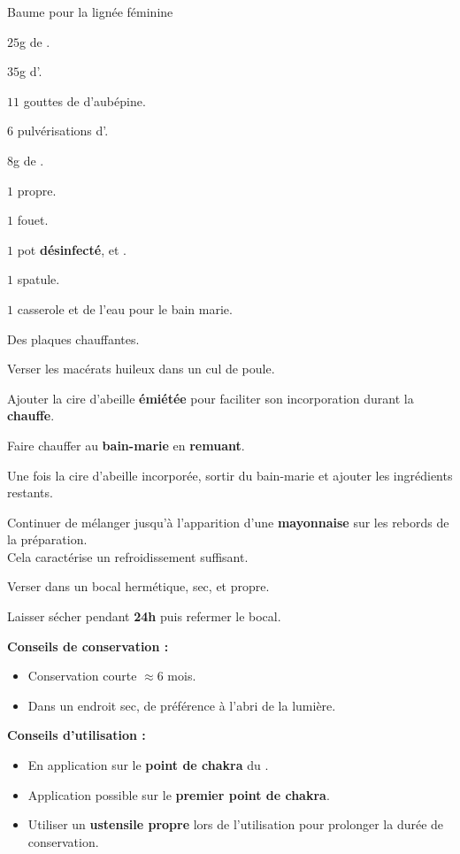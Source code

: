 
\ficherecette
{%
    Baume pour la lignée féminine
}
{%
    \item $25$g de .
    \item $35$g d'.
    \item $11$ gouttes de \teinture d'aubépine.
    \item $6$ pulvérisations d'.
    \item $8$g de .
}
{%
    \item $1$  propre. 
    \item $1$ fouet. 
    \item $1$ pot \textbf{désinfecté},  et .
    \item $1$ spatule. 
    \item $1$ casserole et de l'eau pour le bain marie. 
    \item Des plaques chauffantes.  
}
{%
    \item Verser les macérats huileux dans un cul de poule. 
    \item Ajouter la cire d'abeille \textbf{émiétée} pour faciliter son incorporation durant la \textbf{chauffe}.
    \item Faire chauffer au \textbf{bain-marie} en \textbf{remuant}.
    \item Une fois la cire d'abeille incorporée, sortir du bain-marie et ajouter les ingrédients restants. 
    \item Continuer de mélanger jusqu'à l'apparition d'une \textbf{mayonnaise} sur les rebords de la préparation. \\
            Cela caractérise un refroidissement suffisant.
    \item Verser dans un bocal hermétique, sec, et propre. 
    \item Laisser sécher pendant \textbf{24h} puis refermer le bocal. 
}
{%
    \textbf{Conseils de conservation :}
    \begin{itemize}[label=\faPen]
        \item Conservation courte $\approx 6$ mois.
        \item Dans un endroit sec, de préférence à l'abri de la lumière. 
    \end{itemize}
    \textbf{Conseils d'utilisation :}
    \begin{itemize}[label=\faPen]
        \item En application sur le \textbf{point de chakra} du .
        \item Application possible sur le \textbf{premier point de chakra}.
        \item Utiliser un \textbf{ustensile propre} lors de l'utilisation pour prolonger la durée de conservation. 
    \end{itemize}
}
